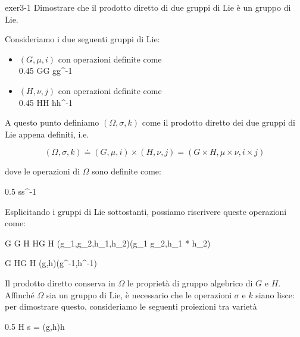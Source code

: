 {exer3-1}
{
Dimostrare che il prodotto diretto di due gruppi di Lie è un gruppo di Lie.
}
{
Consideriamo i due seguenti gruppi di Lie:

\begin{itemize}
	\item $ (G, \mu, i) $ con operazioni definite come \\
		{0.45}{%
					{G}{G}
					{g}{g^{-1}}
				}
	
	\item $ (H, \nu, j) $ con operazioni definite come \\
		{0.45}{%
					{H}{H}
					{h}{h^{-1}}
			}	
\end{itemize}

A questo punto definiamo $ (\Omega, \sigma, k) $ come il prodotto diretto dei due gruppi di Lie appena definiti, i.e.

\begin{equation}
	(\Omega, \sigma, k) \doteq (G, \mu, i) \times (H, \nu, j) = (G \times H, \mu \times \nu, i \times j)
\end{equation}

dove le operazioni di $ \Omega $ sono definite come:

	{0.5}{%
				{\Omega}{\Omega}
				{s}{s^{-1}}
			}

Esplicitando i gruppi di Lie sottostanti, possiamo riscrivere queste operazioni come:

\map{\sigma = \mu \times \nu}
	{G \times G \times H \times H}{G \times H}
	{(g_{1},g_{2},h_{1},h_{2})}{(g_{1} \cdot g_{2},h_{1} * h_{2})}

	{G \times H}{G \times H}
	{(g,h)}{(g^{-1},h^{-1})}

Il prodotto diretto conserva in $ \Omega $ le proprietà di gruppo algebrico di $ G $ e $ H $. Affinché $ \Omega $ sia un gruppo di Lie, è necessario che le operazioni $ \sigma $ e $ k $ siano lisce: per dimostrare questo, consideriamo le seguenti proiezioni tra varietà

	{0.5}{%
				{\Omega}{H}
				{s = (g,h)}{h}
			}

}
